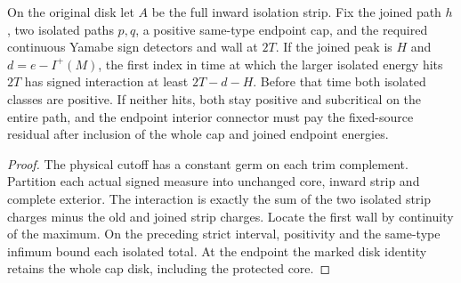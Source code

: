 \begin{proposition}
\label{prop:ed45-isolation}
\leanok
On the original disk let $A$ be the full inward isolation strip. Fix
the joined path $h$, two isolated paths $p,q$, a positive same-type
endpoint cap, and the required continuous Yamabe sign detectors and wall
at $2T$. If the joined peak is $H$ and $d=e-I^+(M)$, the first index
in time at which the larger isolated energy hits $2T$ has signed
interaction at least $2T-d-H$. Before that time both isolated classes
are positive. If neither hits, both stay positive and subcritical on
the entire path, and the endpoint interior connector must pay the
fixed-source residual after inclusion of the whole cap and joined
endpoint energies.
\end{proposition}
\begin{proof}
\leanok
The physical cutoff has a constant germ on each trim complement. Partition
each actual signed measure into unchanged core, inward strip and complete
exterior. The interaction is exactly the sum of the two isolated strip
charges minus the old and joined strip charges. Locate the first wall by
continuity of the maximum. On the preceding strict interval, positivity
and the same-type infimum bound each isolated total. At the endpoint the
marked disk identity retains the whole cap disk, including the protected core.
\end{proof}

